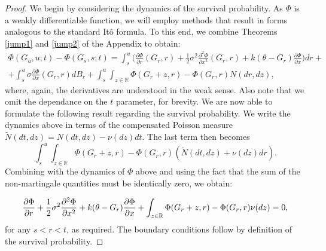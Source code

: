\documentclass[11pt,reqno]{article}
\theoremstyle{definition}
\begin{document}
\begin{proof}
	We begin by considering the dynamics of the survival probability. As $\Phi$ is a weakly differentiable function, we will employ methods that result in forms analogous to the standard It\^o formula. To this end, we combine Theorems \ref{jump1} and \ref{jump2} of the Appendix to obtain:
	\begin{eqnarray}
	\Phi(G_u,u;t) - \Phi(G_s,s;t)= \int_{s}^{u} \Big(\frac{\partial \Phi}{\partial r}(G_r,r)+\frac{1}{2} \sigma^{2} \frac{\partial^{2} \Phi}{\partial x^2}(G_r,r)+ k(\theta-G_r) \frac{\partial \Phi}{\partial x}\Big) dr + \nonumber\\ 
	+ \int_{s}^{u} \sigma \frac{\partial \Phi}{\partial x}( G_r,r) dB_{r}+\int_{s}^{u} \int_{z \in \mathbb{R}} \Phi(G_r+z,r)-\Phi(G_r,r) N(dr, dz), \quad \quad
	\end{eqnarray}
	where, again, the derivatives are understood in the weak sense. Also note that we omit the dependance on the $t$ parameter, for brevity. %
	We are now able to formulate the following result regarding the survival probability.
	We write the dynamics above in terms of the compensated Poisson measure $\tilde{N}(dt,dz)=N(dt,dz)-\nu(dz)dt$.
	The last term then becomes
	$$\int_{s}^{u} \int_{z \in \mathbb{R}}\Phi(G_r+z, r)-\Phi(G_r, r)(\tilde{N}(dt, dz)+\nu(dz) dr).$$
	Combining with the dynamics of $\Phi$ above and using the fact that the sum of the non-martingale quantities must be identically zero, we obtain:  
	
	\begin{equation} %
	\frac{\partial \Phi}{\partial r}+\frac{1}{2} \sigma^{2} \frac{\partial^{2} \Phi}{\partial x^{2}}+k(\theta-G_r) \frac{\partial \Phi}{\partial x}  \\ +\int_{z \in \mathbb{R}}\Phi(G_r+z,r)-\Phi(G_r,r) \nu(dz)=0, 
	\end{equation}
	for any $s<r<t$, as required. The boundary conditions follow by definition of the survival probability.
\end{proof}
\end{document}
